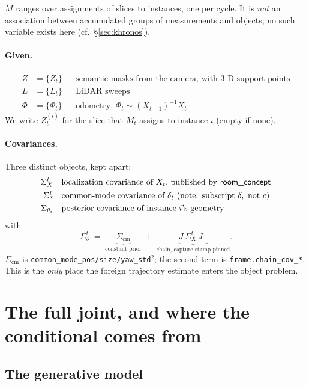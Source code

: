 \documentclass[11pt,a4paper]{report}
\theoremstyle{definition}   %
\begin{document}
\noindent
$M$ ranges over assignments of slices to instances, one per cycle. It is \emph{not} an
association between accumulated groups of measurements and objects; no such variable exists here
(cf.\ \S\ref{sec:khronos}).

\paragraph{Given.}
\begin{align*}
Z &=\{Z_t\}       && \text{semantic masks from the camera, with 3-D support points}\\
L &=\{L_t\}       && \text{LiDAR sweeps}\\
\Phi &=\{\Phi_t\} && \text{odometry, } \Phi_t\sim (X_{t-1})^{-1}X_t
\end{align*}
We write $Z_t^{(i)}$ for the slice that $M_t$ assigns to instance $i$ (empty if none).

\paragraph{Covariances.} Three distinct objects, kept apart:
\begin{align*}
\Sigma_X^t  &&& \text{localization covariance of }X_t\text{, published by \textsf{room\_concept}}\\
\Sigma_\delta^t &&& \text{common-mode covariance of }\delta_t\ \text{(note: subscript }\delta,\ \text{not }c)\\
\Sigma_{\theta_i} &&& \text{posterior covariance of instance }i\text{'s geometry}
\end{align*}
with
\begin{equation}
\Sigma_\delta^t \;=\; \underbrace{\Sigma_{\mathrm{cm}}}_{\text{constant prior}}
\;+\; \underbrace{J\,\Sigma_X^t\,J^{\!\top}}_{\text{chain, capture-stamp pinned}} .
\label{eq:sigmadelta}
\end{equation}
$\Sigma_{\mathrm{cm}}$ is \texttt{common\_mode\_pos/size/yaw\_std}${}^2$; the second term is
\texttt{frame.chain\_cov\_*}. This is the \emph{only} place the foreign trajectory estimate
enters the object problem.

\section{The full joint, and where the conditional comes from}
\label{sec:joint}

\subsection{The generative model}
\end{document}
